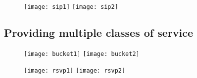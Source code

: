 \begin{figure}[H]
  \centering
  \texttt{[image: sip1]}
  \texttt{[image: sip2]}
\end{figure}

\subsection{Providing multiple classes of service}

\begin{figure}[H]
  \centering
  \texttt{[image: bucket1]}
  \texttt{[image: bucket2]}
\end{figure}

\begin{figure}[H]
  \centering
  \texttt{[image: rsvp1]}
  \texttt{[image: rsvp2]}
\end{figure}






